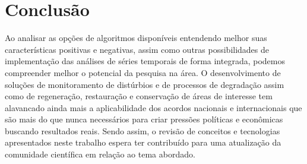 \documentclass[twocolumn]{article}
\begin{document}
\section{Conclusão}
Ao analisar as opções de algoritmos disponíveis entendendo melhor suas características positivas e negativas, assim como outras possibilidades de implementação das análises de séries temporais de forma integrada, podemos compreender melhor o potencial da pesquisa na área. O desenvolvimento de soluções de monitoramento de distúrbios e de processos de degradação assim como de regeneração, restauração e conservação de áreas de interesse tem alavancado ainda mais a aplicabilidade dos acordos nacionais e internacionais que são mais do que nunca necessários para criar pressões políticas e econômicas buscando resultados reais. Sendo assim, o revisão de conceitos e tecnologias apresentados neste trabalho espera ter contribuído para uma atualização da comunidade científica em relação ao tema abordado.



\end{document}

